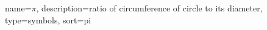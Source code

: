 

{
  name={\ensuremath{\pi}},
  description={ratio of circumference of circle to its
               diameter},
  type=symbols,
  sort={pi}
}


